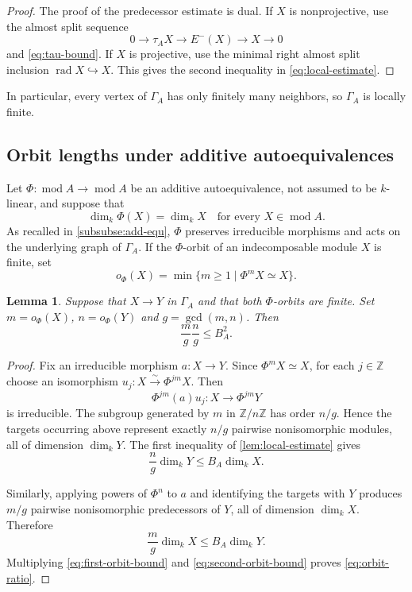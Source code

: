 \documentclass[11pt,letterpaper,reqno]{amsart}
\newtheorem{lemma}[lemma]{Lemma}
\theoremstyle{definition}
\DeclareMathOperator{\rad}{rad}
\newcommand{\modcat}{\operatorname{mod}}
\begin{document}
\begin{proof}
The proof of the predecessor estimate is dual.  If $X$ is nonprojective,
use the almost split sequence
\[
0\longrightarrow\tau_AX\longrightarrow E^-(X)
\longrightarrow X\longrightarrow0
\]
and \eqref{eq:tau-bound}.  If $X$ is projective, use the minimal right almost
split inclusion $\rad X\hookrightarrow X$.  This gives the second inequality
in \eqref{eq:local-estimate}.
\end{proof}

In particular, every vertex of $\Gamma_A$ has only finitely many neighbors,
so $\Gamma_A$ is locally finite.

\subsection{Orbit lengths under additive autoequivalences}
\label{subsec:orbit-lengths}

Let $\Phi:\modcat A\longrightarrow\modcat A$ be an additive autoequivalence, not assumed to be $k$-linear, and suppose
that
\[
\dim_k\Phi(X)=\dim_kX
\quad\text{for every }X\in\modcat A.
\]
As recalled in \cref{subsubse:add-equ}, $\Phi$ preserves
irreducible morphisms and acts on the underlying graph of $\Gamma_A$.  If
the $\Phi$-orbit of an indecomposable module $X$ is finite, set
\[
o_\Phi(X)=\min\{m\geq1\mid\Phi^mX\simeq X\}.
\]



\begin{lemma}\label{lem:adjacent-orbits}
Suppose that $X\longrightarrow Y$ in $\Gamma_A$ and that both $\Phi$-orbits are finite. Set $m=o_\Phi(X)$, $n=o_\Phi(Y)$ and $g=\gcd(m,n)$. Then
\begin{equation}\label{eq:orbit-ratio}
\frac{m}{g}\frac{n}{g}\leq B_A^2.
\end{equation}
\end{lemma}

\begin{proof}
Fix an irreducible morphism $a:X\to Y$.  Since $\Phi^mX\simeq X$, for each
$j\in\mathbb Z$ choose an isomorphism
$u_j:X\xrightarrow{\sim}\Phi^{jm}X$.  Then
\[
\Phi^{jm}(a)u_j:X\longrightarrow\Phi^{jm}Y
\]
is irreducible.  The subgroup generated by $m$ in $\mathbb Z/n\mathbb Z$
has order $n/g$.  Hence the targets occurring above represent exactly
$n/g$ pairwise nonisomorphic modules, all of dimension $\dim_kY$.  The
first inequality of \cref{lem:local-estimate} gives
\begin{equation}\label{eq:first-orbit-bound}
\frac{n}{g}\dim_kY\leq B_A\dim_kX.
\end{equation}

Similarly, applying powers of $\Phi^n$ to $a$ and identifying the targets
with $Y$ produces $m/g$ pairwise nonisomorphic predecessors of $Y$, all of
dimension $\dim_kX$.  Therefore
\begin{equation}\label{eq:second-orbit-bound}
\frac{m}{g}\dim_kX\leq B_A\dim_kY.
\end{equation}
Multiplying \eqref{eq:first-orbit-bound} and
\eqref{eq:second-orbit-bound} proves \eqref{eq:orbit-ratio}.
\end{proof}
\end{document}

